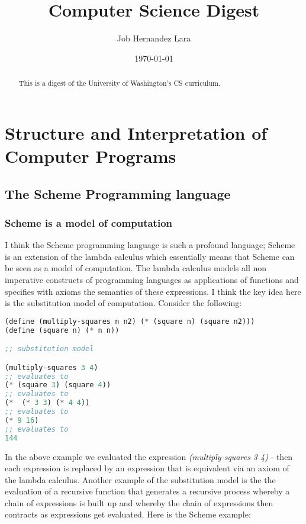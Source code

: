 \documentclass{amsbook}
\begin{document}
\frontmatter 

\title{Computer Science Digest}

\author{Job Hernandez Lara}
\date{\today}

\begin{abstract}
This is a digest of the University of Washington's CS curriculum.
\end{abstract}

\maketitle 

\newpage 

\tableofcontents 

\mainmatter

\chapter{Structure and Interpretation of Computer Programs}
\section{The Scheme Programming language}
\subsection{Scheme is a model of computation}

I think the Scheme programming language is such a profound language; Scheme is an extension of the lambda calculus which essentially means that Scheme can be seen as a model of computation. The lambda calculus models all non imperative constructs of programming languages as applications of functions and specifies with axioms the semantics of these expressions. I think the key idea here is the substitution model of computation. Consider the following:

\begin{lstlisting}[language=Lisp]
(define (multiply-squares n n2) (* (square n) (square n2)))
(define (square n) (* n n))

;; substitution model

(multiply-squares 3 4)
;; evaluates to
(* (square 3) (square 4))
;; evaluates to
(*  (* 3 3) (* 4 4))
;; evaluates to
(* 9 16)
;; evaluates to
144
\end{lstlisting}

In the above example we evaluated the expression \textit{(multiply-squares 3 4)} - then each expression is replaced by an expression that is equivalent via an axiom of the lambda calculus. Another example of the substitution model is the the evaluation of a recursive function that generates a recursive process whereby a chain of expressions is built up and whereby the chain of expressions then contracts as expressions get evaluated. Here is the Scheme example:
\end{document}
